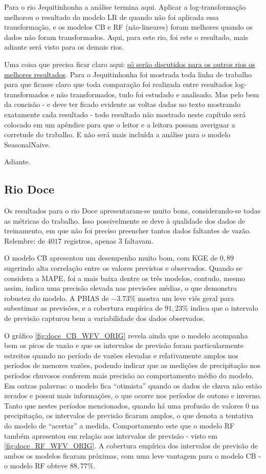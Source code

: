 Para o rio Jequitinhonha a análise termina aqui. Aplicar a log-transformação melhorou o resultado do modelo LR de quando não foi aplicada essa transformação, e os modelos CB e RF (não-lineares) foram melhores quando os dados não foram transformados. Aqui, para este rio, foi este o resultado, mais adiante será visto para os demais rios.

Uma coisa que precisa ficar claro aqui: \underline{só serão discutidos para os outros rios os melhores resultados}. Para o Jequitinhonha foi mostrada toda linha de trabalho para que ficasse claro que toda comparação foi realizada entre resultados log-transformados e não transformados, tudo foi estudado e analisado. Mas pelo bem da concisão - e deve ter ficado evidente as voltas dadas no texto mostrando exatamente cada resultado - todo resultado não mostrado neste capítulo será colocado em um apêndice para que o leitor e a leitora possam averiguar a corretude do trabalho. E não será mais incluída a análise para o modelo SeasonalNaive.

Adiante.

\subsection{Rio Doce}

Os resultados para o rio Doce apresentaram-se muito bons, considerando-se todas as métricas do trabalho. Isso possivelmente se deve à qualidade dos dados de treinamento, em que não foi preciso preencher tantos dados faltantes de vazão. Relembre: de $4017$ registros, apenas $3$ faltavam.

O modelo CB apresentou um desempenho muito bom, com KGE de $0,89$ sugerindo alta correlação entre os valores previstos e observados. Quando se considera a MAPE, foi a mais baixa dentre os três modelos, contudo, mesmo assim, indica uma precisão elevada nas previsões médias, o que demonstra robustez do modelo. A PBIAS de $-3.73\%$ mostra um leve viés geral para subestimar as previsões, e a cobertura empírica de $91,23\%$ indica que o intervalo de previsão capturou bem a variabilidade dos dados observados.

O gráfico \ref{fig:doce_CB_WFV_ORIG} revela ainda que o modelo acompanha bem os picos de vazão e que os intervalos de previsão foram particularmente estreitos quando no período de vazões elevadas e relativamente amplos nos períodos de menores vazões, podendo indicar que as medições de precipitação nos períodos chuvosos conferem mais precisão ao comportamento médio do modelo. Em outras palavras: o modelo fica ``otimista'' quando os dados de chuva não estão zerados e possui mais informações, o que ocorre nos períodos de outono e inverno. Tanto que nestes períodos mencionados, quando há uma profusão de valores $0$ na precipitação, os intervalos de previsão ficaram amplos, o que denota a tentativa do modelo de ``acertar'' a medida. Comportamento este que o modelo RF também apresentou em relação aos intervalos de previsão - visto em \ref{fig:doce_RF_WFV_ORIG}. A cobertura empírica dos intervalos de previsão de ambos os modelos ficaram próximas, com uma leve vantagem para o modelo CB - o modelo RF obteve $88,77\%$.


